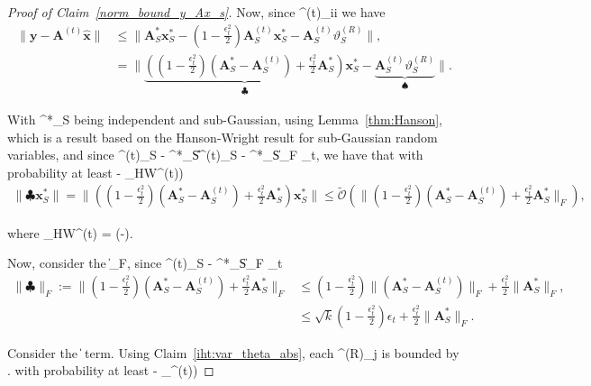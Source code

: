 \documentclass{article}
\newcommand{\siri}[1]{{\color{black}{#1}}}
\def\[#1\]{{$#1$}}
\def\b#1{{\mathbf{#1}}}
\begin{document}
\begin{proof}[Proof of Claim~\ref{norm_bound_y_Ax_s}]
	Now, since \[\Lambda^{(t)}_{ii} \leq {}\] we have
    \begin{align*}
    \|\b{y} - \b{A}^{(t)}\hat{\b{x}}\| 
   
    &\leq \|\b{A}^*_S\b{x}^*_S  - (1 - \tfrac{\epsilon_t^2}{2}) \b{A}^{(t)}_S\b{x}^*_S  - \b{A}^{(t)}_S\vartheta^{(R)}_S\|,\\
    &=\|\underbrace{((1 - \tfrac{\epsilon_t^2}{2})(\b{A}^*_S  - \b{A}^{(t)}_S) +\tfrac{\epsilon_t^2}{2}\b{A}^*_S)}_{\clubsuit}\b{x}^*_S - \underbrace{\b{A}^{(t)}_S\vartheta^{(R)}_S}_{\spadesuit}\|.
    \end{align*}
    
	With \[\b{x}^*_S\] being independent and sub-Gaussian, using Lemma~\ref{thm:Hanson}, which is a result based on the Hanson-Wright result \citep{Hanson1971} for sub-Gaussian random variables, and since \[\|\b{A}^{(t)}_S - \b{A}^*_S\| \leq \|\b{A}^{(t)}_S - \b{A}^*_S\|_F \leq {}\epsilon_t\], we have that with probability at least \[(1 - \delta_{\rm HW}^{(t)})\]
	\begin{align*}
	\|\clubsuit\b{x}^*_S\| = \|((1 - \tfrac{\epsilon_t^2}{2})(\b{A}^*_S  - \b{A}^{(t)}_S) +\tfrac{\epsilon_t^2}{2}\b{A}^*_S)\b{x}^*_S\| \leq \tilde{\mathcal{O}}(\|(1 - \tfrac{\epsilon_t^2}{2})(\b{A}^*_S  - \b{A}^{(t)}_S) +\tfrac{\epsilon_t^2}{2}\b{A}^*_S\|_F),
	\end{align*}
	
    where \[\delta_{\rm HW}^{(t)} = \exp(-)\].
    
  
	Now, consider the \[\|\clubsuit\|_F\], since \[\|\b{A}^{(t)}_S - \b{A}^*_S\|_F \leq {}\epsilon_t\]
	\begin{align*}
	\|\clubsuit\|_F := \|(1 - \tfrac{\epsilon_t^2}{2})(\b{A}^*_S  - \b{A}^{(t)}_S) +\tfrac{\epsilon_t^2}{2}\b{A}^*_S\|_F
	&\leq  (1 - \tfrac{\epsilon_t^2}{2})\| (\b{A}^*_S -\b{A}^{(t)}_S)\|_F + \tfrac{\epsilon_t^2}{2}\|\b{A}^*_S\|_F,\\
	& \leq  \sqrt{k}(1 - \tfrac{\epsilon_t^2}{2})\epsilon_t + \tfrac{\epsilon_t^2}{2}\|\b{A}^*_S\|_F.
	\end{align*}
	
	Consider the \[\|\spadesuit\|\] term. Using Claim~\ref{iht:var_theta_abs}, each \[\vartheta^{(R)}_j\] is bounded by \[ \siri{\mathcal{O}(t_{\beta})}.\] with probability at least \[(1 - \delta_{\beta}^{(t)})\]













\end{proof}
\end{document}
